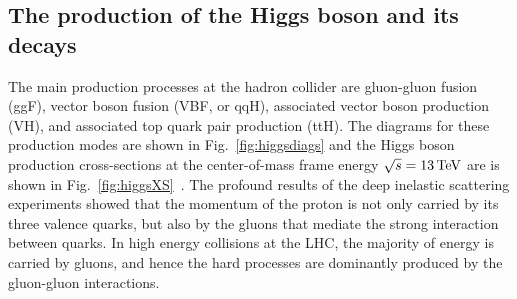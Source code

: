 \subsection{The production of the Higgs boson and its decays}
The main production processes at the hadron collider are gluon-gluon fusion (ggF), vector boson fusion (VBF, or qqH), associated vector boson production (VH), and associated top quark pair production (ttH). The diagrams for these production modes are shown in Fig.~\ref{fig:higgsdiags} and the Higgs boson production cross-sections at the center-of-mass frame energy $\sqrt{s}=13\,\text{Te\hspace{-.08em}V}$ are is shown in Fig.~\ref{fig:higgsXS}~\cite{LHCHXSWG}. 
The profound results of the deep inelastic scattering experiments showed that the momentum of the proton is not only carried by its three valence quarks, but also by the gluons that mediate the strong interaction between quarks. In high energy collisions at the LHC, the majority of energy is carried by gluons, and hence the hard processes are dominantly produced by the gluon-gluon interactions.

